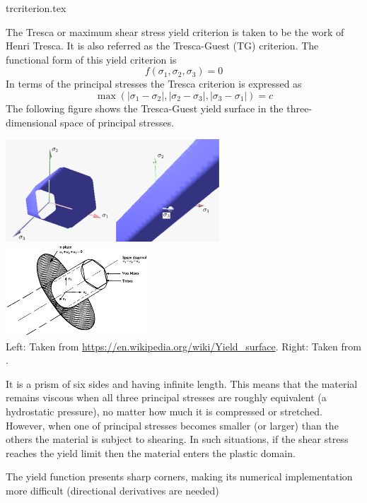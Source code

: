 \begin{flushright} {\tiny {\color{gray} trcriterion.tex}} \end{flushright}

The Tresca or maximum shear stress yield criterion is taken to be the work of Henri Tresca. It is also referred as the Tresca-Guest (TG) criterion. The functional form of this yield criterion is
\[
f(\sigma_1,\sigma_2,\sigma_3) = 0
\]
In terms of the principal stresses the Tresca criterion is expressed as
\[
{\max(|\sigma_1 - \sigma_2| , |\sigma_2 - \sigma_3| , |\sigma_3 - \sigma_1| ) = c }
\]
The following figure shows the Tresca-Guest yield surface in the three-dimensional space of principal stresses. 
\begin{center}
\includegraphics[width=0.6\textwidth]{images/rheology/tresca/Tresca.pdf}
\includegraphics[width=0.4\textwidth]{images/rheology/tresca/owenhinton4}\\
{\captionfont Left: Taken from \url{https://en.wikipedia.org/wiki/Yield_surface}.
Right: Taken from \textcite{owhi}.}
\end{center}
It is a prism of six sides and having infinite length. This means that the 
material remains viscous when all three principal stresses are roughly equivalent 
(a hydrostatic pressure), no matter how much it is compressed or stretched. 
However, when one of principal stresses becomes smaller (or larger) than the others 
the material is subject to shearing. In such situations, if the shear 
stress reaches the yield limit then the material enters the plastic domain. 

\begin{remark}
The yield function presents sharp corners, making its numerical implementation 
more difficult (directional derivatives are needed)
\end{remark}

